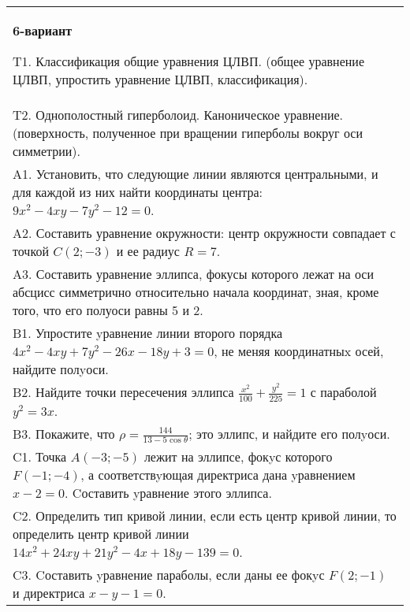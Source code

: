 \documentclass{article}
\begin{document}
\begin{tabular}{m{17cm}}
\textbf{6-вариант}
\newline

T1. Классификация общие уравнения ЦЛВП. (общее уравнение ЦЛВП, упростить уравнение ЦЛВП, классификация).\\

T2. Однополостный гиперболоид. Каноническое уравнение. (поверхность, полученное при вращении гиперболы вокруг оси симметрии).\\

A1. Установить, что следующие линии являются центральными, и для каждой из них найти координаты центра: $9x^{2}-4xy-7y^{2}-12=0$.\\

A2. Составить уравнение окружности: центр окружности совпадает с точкой $C(2;-3)$ и ее радиус $R=7$.\\

A3. Составить уравнение эллипса, фокусы которого лежат на оси абсцисс симметрично относительно начала координат, зная, кроме того, что его полуоси равны 5 и 2.\\

B1. Упростите yравнение линии второго порядка $4x^{2} - 4xy + 7y^{2} - 26x - 18y + 3 = 0$, не меняя координатныx осей, найдите полyоси.\\

B2. Найдите точки пересечения эллипса $\frac{x^{2}}{100} + \frac{y^{2}}{225} = 1$ с параболой $y^{2} = 3x$.\\

B3. Покажите, что $\rho = \frac{144}{13 - 5\cos\theta}$; это эллипс, и найдите его полyоси.\\

C1. Точка $A(-3;-5)$ лежит на эллипсе, фокyс которого $F(-1;-4)$, а соответствyющая директриса дана yравнением $x-2=0$. Cоставить yравнение этого эллипса.  \\

C2. Определить тип кривой линии, если есть центр кривой линии, то определить центр кривой линии $14x^{2}+24xy+21y^{2}-4x+18y-139=0$.  \\

C3. Cоставить yравнение параболы, если даны ее фокyс $F(2;-1)$ и директриса $x-y-1=0$.  \\

\end{tabular}
\vspace{1cm}
\end{document}
